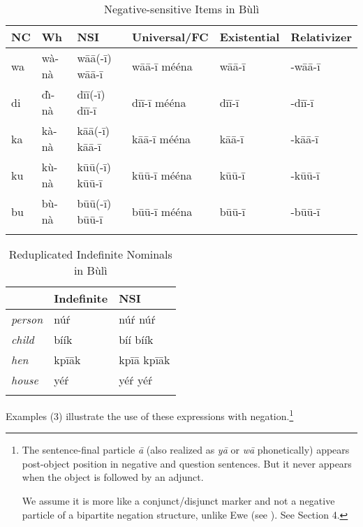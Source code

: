 \documentclass[output=paper,colorlinks,citecolor=brown]{langscibook}
\begin{document}
\begin{table}
  \begin{tabular}{l l l l l l}
\lsptoprule
NC  &  Wh  &  NSI  &  Universal/FC & Existential & Relativizer    \\
  \midrule
wa & wà-nà &   wāā(-ī) wāā-ī &    wāā-ī mééna & wāā-ī & -wāā-ī  \\
di &  d\`{\i}-nà & dīī(-ī)  dīī-ī &  dīī-ī mééna & dīī-ī & -dīī-ī    \\
ka &  kà-nà &  kāā(-ī)  kāā-ī  & kāā-ī mééna &  kāā-ī & -kāā-ī   \\
ku &  kù-nà &  k\=u\=u(-ī)  k\=u\=u-ī  & k\=u\=u-ī mééna & k\=u\=u-ī & -k\=u\=u-ī  \\
bu &  bù-nà &  b\=u\=u(-ī)  b\=u\=u-ī  &  b\=u\=u-ī mééna  & b\=u\=u-ī &  -b\=u\=u-ī \\
\lspbottomrule
  \end{tabular}
  \caption{Negative-sensitive Items in Bùlì}
  \label{tab3}
\end{table}

\begin{table}
  \begin{tabular}{lll}
\lsptoprule
  & Indefinite   & NSI     \\
  \midrule
\textit{person} & n\'u\'r &  n\'u\'r n\'u\'r \\
\textit{child} &  bíík &  bíí bíík \\
\textit{hen} &  kpīāk &  kpīā kpīāk \\
\textit{house} &  yé\'r &  yé\'r yé\'r \\
\lspbottomrule
  \end{tabular}
  \caption{Reduplicated Indefinite Nominals in Bùlì}
  \label{tab4}
\end{table}

Examples (3) illustrate the use of these expressions with negation.\footnote{The sentence-final particle \textit{ā} (also realized as \textit{yā} or \textit{wā} phonetically) appears post-object position in negative and question sentences. But it never appears when the object is followed by an adjunct.
\z

We assume it is more like a conjunct/disjunct marker and not a negative particle of a bipartite negation structure, unlike Ewe (see \citealt{CollinsEtAl2017}). See Section 4.  }
\end{document}
